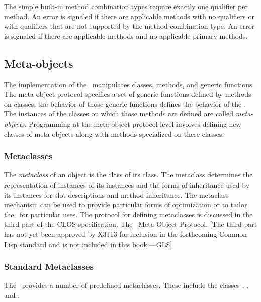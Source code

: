 The simple built-in method combination types require exactly one qualifier per
method.  An error is signaled if there are applicable methods with no
qualifiers or with qualifiers that are not supported by the method
combination type. An error is signaled if there are applicable 
methods and no applicable primary methods.


\subsection{Meta-objects}

The implementation of the \OS\ manipulates classes, methods, and generic
functions.  The meta-object protocol specifies a set of generic
functions defined by methods on classes; the behavior of those generic
functions defines the behavior of the \OS.  The instances of the classes
on which those methods are defined are called \emph{meta-objects}.  Programming
at the meta-object protocol level involves defining new classes of
meta-objects along with methods specialized on these classes.


\subsubsection{Metaclasses}

The \emph{metaclass\/} of an object is the class of its class.  The
metaclass determines the representation of instances of its instances and
the forms of inheritance used by its instances for slot descriptions and
method inheritance.  The metaclass mechanism can be used to provide
particular forms of optimization or to tailor the \CLOS\ for particular
uses.  The protocol for defining metaclasses is discussed in the third part
of the CLOS specification, The \CLOS\ Meta-Object Protocol.
[The third part
has not yet been approved by X3J13 for inclusion in the forthcoming
Common Lisp standard and is not included in this book.---GLS]


\subsubsection{Standard Metaclasses}

The \CLOS\ provides a number of predefined metaclasses.  These include the
classes , , and 
:

